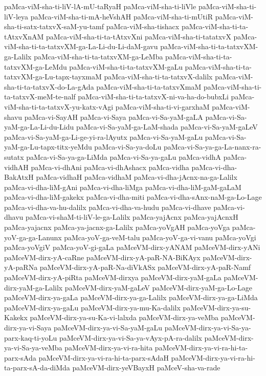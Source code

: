{paMca-viM-sha-ti-liV-lA-mU-taRyaH
paMca-viM-sha-ti-liVle
paMca-viM-sha-ti-liV-leya
paMca-viM-sha-ti-mA-heVshAH
paMca-viM-sha-ti-mUtiR
paMca-viM-sha-ti-satx-tatxvX-saM-yu-tamf
paMca-viM-sha-tishacx
paMca-viM-sha-ti-ta-tAtxvXnAM
paMca-viM-sha-ti-ta-tAtxvXni
paMca-viM-sha-ti-tatatxvX
paMca-viM-sha-ti-ta-tatxvXM-ga-La-Li-du-Li-daM-gavu
paMca-viM-sha-ti-ta-tatxvXM-ga-Lalilx
paMca-viM-sha-ti-ta-tatxvXM-ga-LeMba
paMca-viM-sha-ti-ta-tatxvXM-ga-LeMdu
paMca-viM-sha-ti-ta-tatxvXM-gaLu
paMca-viM-sha-ti-ta-tatxvXM-ga-Lu-tapx-tayxmaM
paMca-viM-sha-ti-ta-tatxvX-dalilx
paMca-viM-sha-ti-ta-tatxvX-do-La-gAda
paMca-viM-sha-ti-ta-tatxvXmaM
paMca-viM-sha-ti-ta-tatxvX-meM-te-nalf
paMca-viM-sha-ti-ta-tatxvX-ni-va-ha-do-bubxLi
paMca-viM-sha-ti-ta-tatxvX-yu-katx-vAgi
paMca-viM-sha-ti-vi-garxhaM
paMca-viM-shavu
paMca-vi-SayAH
paMca-vi-Saya
paMca-vi-Sa-yaM-gaLA
paMca-vi-Sa-yaM-ga-La-Li-du-Lidu
paMca-vi-Sa-yaM-ga-LaM-shada
paMca-vi-Sa-yaM-gaLeV
paMca-vi-Sa-yaM-ga-Li-ge-yi-ra-lAyutx
paMca-vi-Sa-yaM-gaLu
paMca-vi-Sa-yaM-ga-Lu-tapx-titx-yeMdu
paMca-vi-Sa-ya-doLu
paMca-vi-Sa-ya-ga-La-nanx-ra-sutatx
paMca-vi-Sa-ya-ga-LiMda
paMca-vi-Sa-ya-gaLu
paMca-vidhA
paMca-vidhAH
paMca-vi-dhAni
paMca-vi-dhAshacx
paMca-vidha
paMca-vi-dha-BakAtxH
paMca-vidhaH
paMca-vidhaM
paMca-vi-dha-jAcnx-na-ga-Lalilx
paMca-vi-dha-liM-gAni
paMca-vi-dha-liMga
paMca-vi-dha-liM-gaM-gaLaM
paMca-vi-dha-liM-gakekx
paMca-vi-dha-miti
paMca-vi-dha-sAnx-naM-ga-Lo-Lage
paMca-vi-dha-va-hu-dalilx
paMca-vi-dha-va-hudu
paMca-vi-dhave
paMca-vi-dhavu
paMca-vi-shaM-ti-liV-le-ga-Lalilx
paMca-yajAcnx
paMca-yajAcnxH
paMca-yajacnx
paMca-ya-jacnx-ga-Lalilx
paMca-yoVgAH
paMca-yoVga
paMca-yoV-ga-ga-Lanunx
paMca-yoV-ga-veM-talu
paMca-yoV-ga-vi-vanu
paMca-yoVgi
paMca-yoVgiV
paMca-yoV-gi-gaLa
paMceVM-dirx-yANAM
paMceVM-dirx-yANi
paMceVM-dirx-yA-caRne
paMceVM-dirx-yA-paR-NA-BiKAyx
paMceVM-dirx-yA-paRNa
paMceVM-dirx-yA-paR-Na-diVkASx
paMceVM-dirx-yA-paR-Namf
paMceVM-dirx-yA-piRta
paMceVM-dirxya
paMceVM-dirx-yaM-gaLa
paMceVM-dirx-yaM-ga-Lalilx
paMceVM-dirx-yaM-gaLeV
paMceVM-dirx-yaM-ga-Lo-Lage
paMceVM-dirx-ya-gaLa
paMceVM-dirx-ya-ga-Lalilx
paMceVM-dirx-ya-ga-LiMda
paMceVM-dirx-ya-gaLu
paMceVM-dirx-ya-mu-Ka-dalilx
paMceVM-dirx-ya-su-Kakekx
paMceVM-dirx-ya-su-Ka-vi-lalxda
paMceVM-dirx-ya-veMba
paMceVM-dirx-ya-vi-Saya
paMceVM-dirx-ya-vi-Sa-yaM-gaLu
paMceVM-dirx-ya-vi-Sa-ya-parx-kaq-ti-yoLu
paMceVM-dirx-ya-vi-Sa-ya-vAyx-pA-ra-dalilx
paMceVM-dirx-ya-vi-Sa-ya-veMba
paMceVM-dirx-ya-vi-ra-hita
paMceVM-dirx-ya-vi-ra-hi-ta-parx-sAda
paMceVM-dirx-ya-vi-ra-hi-ta-parx-sAdaH
paMceVM-dirx-ya-vi-ra-hi-ta-parx-sA-da-diMda
paMceVM-dirx-yeVBayxH
paMceV-sha-va-rade
}
